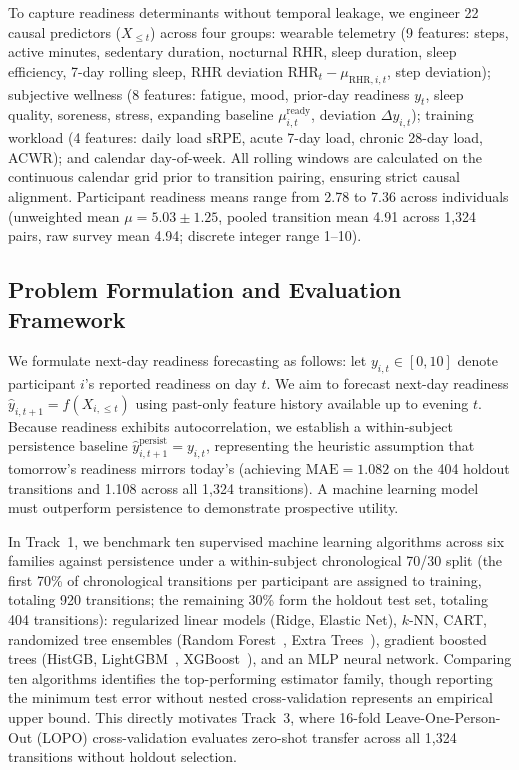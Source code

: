 \documentclass[runningheads]{llncs}
\begin{document}
To capture readiness determinants without temporal leakage, we engineer 22 causal predictors ($X_{\leq t}$) across four groups: wearable telemetry (9 features: steps, active minutes, sedentary duration, nocturnal RHR, sleep duration, sleep efficiency, 7-day rolling sleep, RHR deviation $\text{RHR}_t - \mu_{\text{RHR},i,t}$, step deviation); subjective wellness (8 features: fatigue, mood, prior-day readiness $y_t$, sleep quality, soreness, stress, expanding baseline $\mu_{i,t}^{\text{ready}}$, deviation $\Delta y_{i,t}$); training workload (4 features: daily load $\text{sRPE}$, acute 7-day load, chronic 28-day load, ACWR); and calendar day-of-week. All rolling windows are calculated on the continuous calendar grid prior to transition pairing, ensuring strict causal alignment. Participant readiness means range from 2.78 to 7.36 across individuals (unweighted mean $\mu = 5.03 \pm 1.25$, pooled transition mean 4.91 across 1,324 pairs, raw survey mean 4.94; discrete integer range 1--10).

\subsection{Problem Formulation and Evaluation Framework}
We formulate next-day readiness forecasting as follows: let $y_{i,t} \in [0, 10]$ denote participant $i$'s reported readiness on day $t$. We aim to forecast next-day readiness $\widehat{y}_{i,t+1} = f(X_{i,\leq t})$ using past-only feature history available up to evening $t$. Because readiness exhibits autocorrelation, we establish a within-subject persistence baseline $\widehat{y}_{i,t+1}^{\text{persist}} = y_{i,t}$, representing the heuristic assumption that tomorrow's readiness mirrors today's (achieving $\text{MAE} = 1.082$ on the 404 holdout transitions and 1.108 across all 1,324 transitions). A machine learning model must outperform persistence to demonstrate prospective utility.

In Track~1, we benchmark ten supervised machine learning algorithms across six families against persistence under a within-subject chronological 70/30 split (the first 70\% of chronological transitions per participant are assigned to training, totaling 920 transitions; the remaining 30\% form the holdout test set, totaling 404 transitions): regularized linear models (Ridge, Elastic Net), $k$-NN, CART, randomized tree ensembles (Random Forest~\cite{breiman2001}, Extra Trees~\cite{geurts2006}), gradient boosted trees (HistGB, LightGBM~\cite{ke2017}, XGBoost~\cite{chen2016}), and an MLP neural network. Comparing ten algorithms identifies the top-performing estimator family, though reporting the minimum test error without nested cross-validation represents an empirical upper bound. This directly motivates Track~3, where 16-fold Leave-One-Person-Out (LOPO) cross-validation evaluates zero-shot transfer across all 1,324 transitions without holdout selection.
\end{document}
